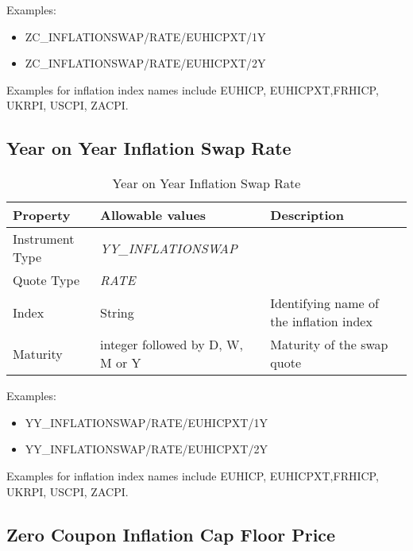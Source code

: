 \medskip
Examples:
\begin{itemize}
\item {ZC\_INFLATIONSWAP/RATE/EUHICPXT/1Y}
\item {ZC\_INFLATIONSWAP/RATE/EUHICPXT/2Y}
\end{itemize}

Examples for inflation index names include EUHICP, EUHICPXT,FRHICP, UKRPI, USCPI, ZACPI.

\subsection{Year on Year Inflation Swap Rate}

\begin{table}[H]
    \centering
    \begin{tabular}{|p{3cm}|p{3.5cm}|p{7cm}|}
      \hline
      {\bf Property} & {\bf Allowable values} & {\bf Description} \\ \hline
      Instrument Type & \emph{YY\_INFLATIONSWAP} & \\ \hline
      Quote Type & \emph{RATE} & \\ \hline
      Index & String & Identifying name of the inflation index \\ \hline
      Maturity & integer followed by D, W, M or Y & Maturity of the swap quote \\ \hline
    \end{tabular}
    \caption{Year on Year Inflation Swap Rate}
    \label{tab:yyinflationswap_quote}
\end{table}

\medskip
Examples:
\begin{itemize}
\item {YY\_INFLATIONSWAP/RATE/EUHICPXT/1Y}
\item {YY\_INFLATIONSWAP/RATE/EUHICPXT/2Y}
\end{itemize}

Examples for inflation index names include EUHICP, EUHICPXT,FRHICP, UKRPI, USCPI, ZACPI.

\subsection{Zero Coupon Inflation Cap Floor Price}


